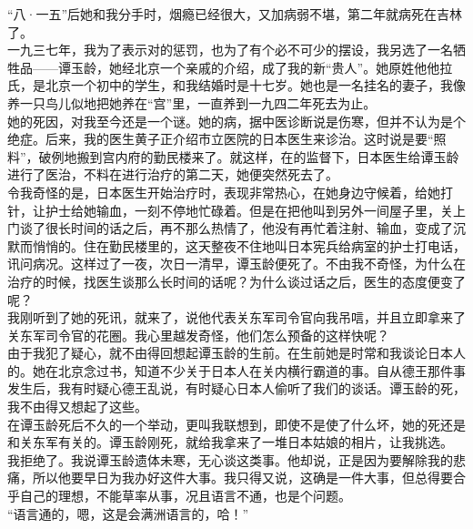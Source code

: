 “八·一五”后她和我分手时，烟瘾已经很大，又加病弱不堪，第二年就病死在吉林了。\\

一九三七年，我为了表示对的惩罚，也为了有个必不可少的摆设，我另选了一名牺牲品——谭玉龄，她经北京一个亲戚的介绍，成了我的新“贵人”。她原姓他他拉氏，是北京一个初中的学生，和我结婚时是十七岁。她也是一名挂名的妻子，我像养一只鸟儿似地把她养在“宫”里，一直养到一九四二年死去为止。\\

她的死因，对我至今还是一个谜。她的病，据中医诊断说是伤寒，但并不认为是个绝症。后来，我的医生黄子正介绍市立医院的日本医生来诊治。这时说是要“照料”，破例地搬到宫内府的勤民楼来了。就这样，在的监督下，日本医生给谭玉龄进行了医治，不料在进行治疗的第二天，她便突然死去了。\\

令我奇怪的是，日本医生开始治疗时，表现非常热心，在她身边守候着，给她打针，让护士给她输血，一刻不停地忙碌着。但是在把他叫到另外一间屋子里，关上门谈了很长时间的话之后，再不那么热情了，他没有再忙着注射、输血，变成了沉默而悄悄的。住在勤民楼里的，这天整夜不住地叫日本宪兵给病室的护士打电话，讯问病况。这样过了一夜，次日一清早，谭玉龄便死了。不由我不奇怪，为什么在治疗的时候，找医生谈那么长时间的话呢？为什么谈过话之后，医生的态度便变了呢？\\

我刚听到了她的死讯，就来了，说他代表关东军司令官向我吊唁，并且立即拿来了关东军司令官的花圈。我心里越发奇怪，他们怎么预备的这样快呢？\\

由于我犯了疑心，就不由得回想起谭玉龄的生前。在生前她是时常和我谈论日本人的。她在北京念过书，知道不少关于日本人在关内横行霸道的事。自从德王那件事发生后，我有时疑心德王乱说，有时疑心日本人偷听了我们的谈话。谭玉龄的死，我不由得又想起了这些。\\

在谭玉龄死后不久的一个举动，更叫我联想到，即使不是使了什么坏，她的死还是和关东军有关的。谭玉龄刚死，就给我拿来了一堆日本姑娘的相片，让我挑选。\\

我拒绝了。我说谭玉龄遗体未寒，无心谈这类事。他却说，正是因为要解除我的悲痛，所以他要早日为我办好这件大事。我只得又说，这确是一件大事，但总得要合乎自己的理想，不能草率从事，况且语言不通，也是个问题。\\

“语言通的，嗯，这是会满洲语言的，哈！”\\

